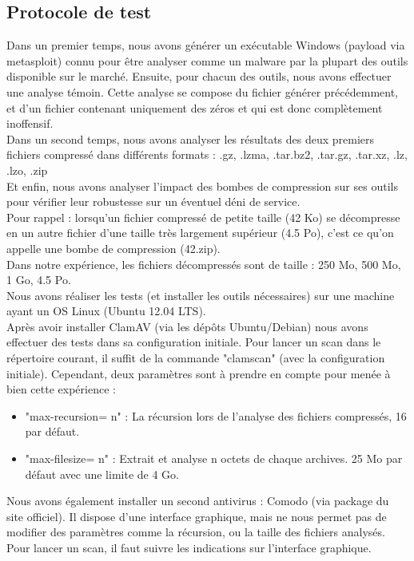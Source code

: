 \documentclass[smallextended]{svjour3}       %
\begin{document}
\subsection{Protocole de test}
\label{3.1Protocole}
Dans un premier temps, nous avons générer un exécutable Windows (payload via metasploit) connu pour être analyser comme un malware par la plupart des outils disponible sur le marché. Ensuite, pour chacun des outils, nous avons effectuer une analyse témoin. Cette analyse se compose du fichier générer précédemment, et d'un fichier contenant uniquement des zéros et qui est donc complètement inoffensif.\\
Dans un second temps, nous avons analyser les résultats des deux premiers fichiers compressé dans différents formats : .gz, .lzma, .tar.bz2, .tar.gz, .tar.xz, .lz, .lzo, .zip\\
Et enfin, nous avons analyser l'impact des bombes de compression sur ses outils pour vérifier leur robustesse sur un éventuel déni de service.\\
Pour rappel : lorsqu'un fichier compressé de petite taille (42 Ko) se décompresse en un autre fichier d'une taille très largement supérieur (4.5 Po), c'est ce qu'on appelle une bombe de compression (42.zip).\\
Dans notre expérience, les fichiers décompressés sont de taille : 250 Mo, 500 Mo, 1 Go, 4.5 Po.
$ $\\
Nous avons réaliser les tests (et installer les outils nécessaires) sur une machine ayant un OS Linux (Ubuntu 12.04 LTS).\\
Après avoir installer ClamAV (via les dépôts Ubuntu/Debian) nous avons effectuer des tests dans sa configuration initiale. Pour lancer un scan dans le répertoire courant, il suffit de la commande "clamscan" (avec la configuration initiale). Cependant, deux paramètres sont à prendre en compte pour menée à bien cette expérience :
\begin{itemize}
\item "max-recursion= n" : La récursion lors de l'analyse des fichiers compressés, 16 par défaut.
\item "max-filesize= n" : Extrait et analyse  n octets de chaque archives. 25 Mo par défaut avec une limite de 4 Go.
\end{itemize}
$ $\\
Nous avons également installer un second antivirus : Comodo (via package du site officiel). Il dispose d'une interface graphique, mais ne nous permet pas de modifier des paramètres comme la récursion, ou la taille des fichiers analysés. Pour lancer un scan, il faut suivre les indications sur l'interface graphique.\\
\end{document}
